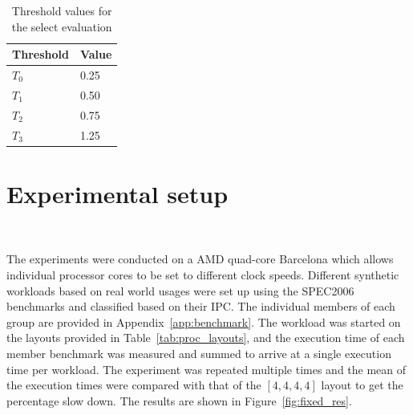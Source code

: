 \begin{table}[h!]
 \begin{center}
\begin{tabular}{| l | l | }
\hline	
Threshold & Value \\
\hline
$T_0$ & 0.25  \\
$T_1$ & 0.50  \\
$T_2$ & 0.75  \\
$T_3$ & 1.25  \\
\hline  
\end{tabular}
 \end{center}
\caption{Threshold values for the select evaluation}
\label{tab:sel_threshold}
\end{table}


\section{Experimental setup}~\label{sec:pds_exp}

The experiments were conducted on a AMD quad-core Barcelona which allows individual
processor cores to be set to different clock speeds. Different synthetic workloads
based on real world usages were set up using the SPEC2006 benchmarks and classified based on their IPC. The 
individual members of each group are provided in Appendix~\ref{app:benchmark}. The workload was started
on the layouts provided in Table~\ref{tab:proc_layouts}, and the execution time of each
member benchmark was measured and summed to arrive at a single execution time per 
workload. The experiment was repeated multiple times and the mean of the execution times were 
compared with that of the $[4,4,4,4]$ layout to get the percentage slow down. 
The results are shown in Figure~\ref{fig:fixed_res}.  

